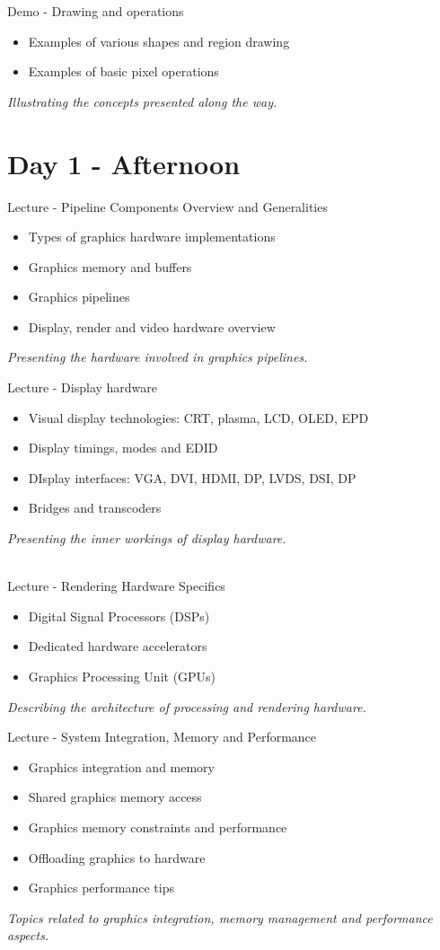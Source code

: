 \documentclass[a4paper,12pt,obeyspaces,spaces,hyphens]{article}
\begin{document}
{Demo - Drawing and operations}
{
  \begin{itemize}
  \item Examples of various shapes and region drawing
  \item Examples of basic pixel operations
  \end{itemize}
  \vspace{0.5em}
  {\em Illustrating the concepts presented along the way.}
}

\section{Day 1 - Afternoon}

\feagendatwocolumn
{Lecture - Pipeline Components Overview and Generalities}
{
  \begin{itemize}
  \item Types of graphics hardware implementations
  \item Graphics memory and buffers
  \item Graphics pipelines
  \item Display, render and video hardware overview
  \end{itemize}
  \vspace{0.5em}
  {\em Presenting the hardware involved in graphics pipelines.}
}
{Lecture - Display hardware}
{
  \begin{itemize}
  \item Visual display technologies: CRT, plasma, LCD, OLED, EPD
  \item Display timings, modes and EDID
  \item DIsplay interfaces: VGA, DVI, HDMI, DP, LVDS, DSI, DP
  \item Bridges and transcoders
  \end{itemize}
  \vspace{0.5em}
  {\em Presenting the inner workings of display hardware.}
}
\\

\feagendatwocolumn
{Lecture - Rendering Hardware Specifics}
{
  \begin{itemize}
  \item Digital Signal Processors (DSPs)
  \item Dedicated hardware accelerators
  \item Graphics Processing Unit (GPUs)
  \end{itemize}
  \vspace{0.5em}
  {\em Describing the architecture of processing and rendering hardware.}
}
{Lecture - System Integration, Memory and Performance}
{
  \begin{itemize}
  \item Graphics integration and memory
  \item Shared graphics memory access
  \item Graphics memory constraints and performance
  \item Offloading graphics to hardware
  \item Graphics performance tips
  \end{itemize}
  \vspace{0.5em}
  {\em Topics related to graphics integration, memory management and performance aspects.}
}
\end{document}
